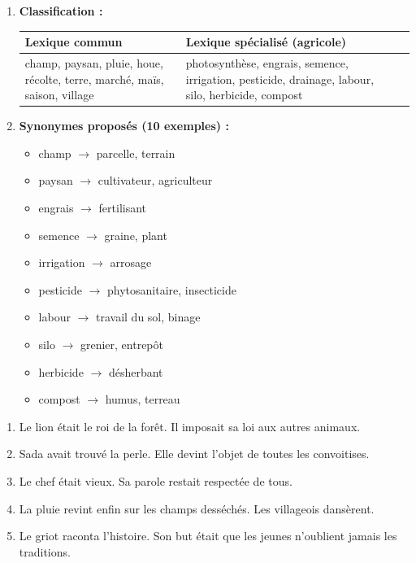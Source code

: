 \documentclass[11pt]{article}
\begin{document}
\begin{corrige}
\begin{enumerate}
\item \textbf{Classification :}
\begin{center}
\begin{tabularx}{\linewidth}{|l|X|X|}\hline
\rowcolor{popblueL} \textbf{Lexique commun} & \textbf{Lexique spécialisé (agricole)} \\ \hline
champ, paysan, pluie, houe, récolte, terre, marché, maïs, saison, village & photosynthèse, engrais, semence, irrigation, pesticide, drainage, labour, silo, herbicide, compost \\ \hline
\end{tabularx}
\end{center}
\item \textbf{Synonymes proposés (10 exemples) :}
\begin{itemize}
\item champ $\rightarrow$ parcelle, terrain
\item paysan $\rightarrow$ cultivateur, agriculteur
\item engrais $\rightarrow$ fertilisant
\item semence $\rightarrow$ graine, plant
\item irrigation $\rightarrow$ arrosage
\item pesticide $\rightarrow$ phytosanitaire, insecticide
\item labour $\rightarrow$ travail du sol, binage
\item silo $\rightarrow$ grenier, entrepôt
\item herbicide $\rightarrow$ désherbant
\item compost $\rightarrow$ humus, terreau
\end{itemize}
\end{enumerate}
\end{corrige}

\begin{corrige}
\begin{enumerate}
\item Le lion était le roi de la forêt. Il imposait sa loi aux autres animaux.
\item Sada avait trouvé la perle. Elle devint l'objet de toutes les convoitises.
\item Le chef était vieux. Sa parole restait respectée de tous.
\item La pluie revint enfin sur les champs desséchés. Les villageois dansèrent.
\item Le griot raconta l'histoire. Son but était que les jeunes n'oublient jamais les traditions.
\end{enumerate}
\end{corrige}
\end{document}
